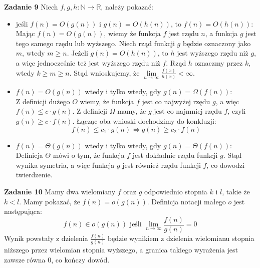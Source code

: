 \documentclass[a4paper,12pt]{article}
\begin{document}
\noindent \newline \textbf{Zadanie 9} \newline
Niech $f, g, h : \mathbb{N} \to \mathbb{R}$, należy pokazać:
\begin{itemize}
\item jeśli $f(n) = O(g(n))$ i $g(n) = O(h(n))$, to $f(n)=O(h(n))$: \\
	Mając $f(n) = O(g(n))$, wiemy że funkcja $f$ jest rzędu $n$, a funkcja $g$ jest tego samego rzędu lub wyższego. Niech rząd funkcji $g$ będzie oznaczony jako $m$, wtedy $m \geq n$. Jeżeli $g(n) = O(h(n))$, to $h$ jest wyższego rzędu niż $g$, a więc jednocześnie też jest wyższego rzędu niż $f$. Rząd $h$ oznaczmy przez $k$, wtedy $k \geq m \geq n$. Stąd wnioskujemy, że $\lim\limits_{n\to\infty} \frac{f(x)}{h(x)} < \infty$.
\item $f(n) = O(g(n))$ wtedy i tylko wtedy, gdy $g(n) = \Omega(f(n))$: \\
	Z definicji dużego $O$ wiemy, że funkcja $f$ jest co najwyżej rzędu $g$, a więc $f(n) \leq c\cdot g(n)$. Z definicji $\Omega$ mamy, że $g$ jest co najmniej rzędu $f$, czyli $g(n) \geq c\cdot f(n)$. Łącząc oba wnioski dochodzimy do konkluzji:
	$$ f(n) \leq c_1 \cdot g(n) \Longleftrightarrow g(n) \geq c_2 \cdot f(n) $$
\item $f(n) = \Theta(g(n))$ wtedy i tylko wtedy, gdy $g(n) = \Theta(f(n))$: \\
	Definicja $\Theta$ mówi o tym, że funkcja $f$ jest dokładnie rzędu funkcji $g$. Stąd wynika symetria, a więc funkcja $g$ jest również rzędu funkcji $f$, co dowodzi twierdzenie.

\end{itemize}

\newpage
\noindent \textbf{Zadanie 10} \newline
Mamy dwa wielomiany $f$ oraz $g$ odpowiednio stopnia $k$ i $l$, takie że $k < l$. Mamy pokazać, że $f(n) = o(g(n))$. Definicja notacji małego $o$ jest następująca:
$$f(n)\in o(g(n)) \text{ jeśli } \lim\limits_{n\to\infty} \frac{f(n)}{g(n)}=0$$
Wynik powstały z dzielenia $\frac{f(n)}{g(n)}$ będzie wynikiem z dzielenia wielomianu stopnia niższego przez wielomian stopnia wyższego, a granica takiego wyrażenia jest zawsze równa 0, co kończy dowód.
\end{document}
